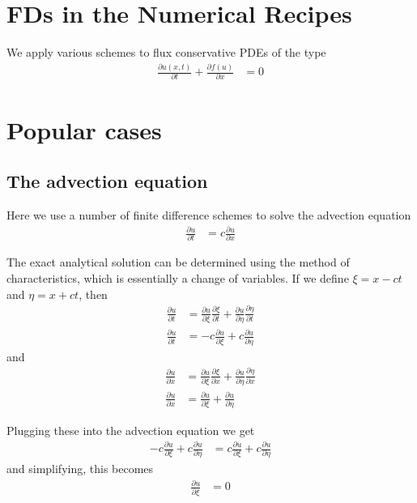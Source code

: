 \documentclass[twocolumn]{myarticle}
\begin{document}
\section{FDs in the Numerical Recipes}
\label{sec:fds_in_the_numerical_recipes}

We apply various schemes to flux conservative PDEs of the type
\begin{align}
    \frac{\partial u(x,t)}{\partial t} + \frac{\partial f(u)}{\partial x} &= 0
\end{align}

\section{Popular cases}
\label{sec:popular_cases}

\subsection{The advection equation}
\label{subsec:the_advection_equation}

Here we use a number of finite difference schemes to solve the advection equation
\begin{align}
    \frac{\partial u}{\partial t} &= c \frac{\partial u}{\partial x}
\end{align}

The exact analytical solution can be determined using the method of characteristics, which is essentially a change of variables.
If we define $ \xi = x - ct $ and $ \eta = x + ct $, then
\begin{align}
    \frac{\partial u}{\partial t} &= \frac{\partial u}{\partial \xi} \frac{\partial \xi}{\partial t} + \frac{\partial u}{\partial \eta} \frac{\partial \eta}{\partial t}
    \\
    \frac{\partial u}{\partial t} &= - c \frac{\partial u}{\partial \xi} + c \frac{\partial u}{\partial \eta}
\end{align}
and
\begin{align}
    \frac{\partial u}{\partial x} &= \frac{\partial u}{\partial \xi} \frac{\partial \xi}{\partial x} + \frac{\partial u}{\partial \eta} \frac{\partial \eta}{\partial x}
    \\
    \frac{\partial u}{\partial x} &= \frac{\partial u}{\partial \xi} + \frac{\partial u}{\partial \eta}
\end{align}

Plugging these into the advection equation we get
\begin{align}
    -c \frac{\partial u}{\partial \xi} + c \frac{\partial u}{\partial \eta} &= c \frac{\partial u }{\partial \xi} + c \frac{\partial u}{\partial \eta}
\end{align}
and simplifying, this becomes
\begin{align}
    \frac{\partial u}{\partial \xi} &= 0
\end{align}
\end{document}
